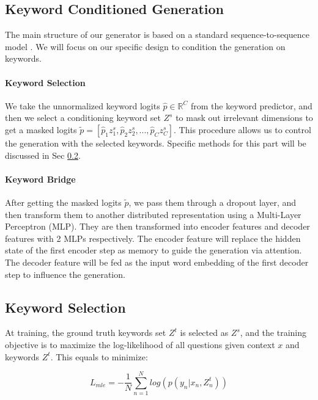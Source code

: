 \documentclass[letterpaper]{article} %
\begin{document}
\subsection{Keyword Conditioned Generation}

The main structure of our generator is based on a standard sequence-to-sequence model \citep{luong2015effective}. We will focus on our specific design to condition the generation on keywords. 

\paragraph{Keyword Selection} We take the unnormalized keyword logits $\hat{p} \in \mathbb{R}^C$ from the keyword predictor, and then we select a conditioning keyword set $Z^s$ to mask out irrelevant dimensions to get a masked logits $\tilde{p} = [\hat{p}_1 z^s_1, \hat{p}_2 z^s_2, ..., \hat{p}_C z^s_C]$. This procedure allows us to control the generation with the selected keywords. Specific methods for this part will be discussed in Sec \ref{sec:selection}.

\paragraph{Keyword Bridge} After getting the masked logits $\tilde{p}$, we pass them through a dropout layer, and then transform them to another distributed representation using a Multi-Layer Perceptron (MLP). They are then transformed into encoder features and decoder features with 2 MLPs respectively. The encoder feature will replace the hidden state of the first encoder step as memory to guide the generation via attention. The decoder feature will be fed as the input word embedding of the first decoder step to influence the generation.

\subsection{Keyword Selection}
\label{sec:selection}
At training, the ground truth keywords set $Z^t$ is selected as $Z^s$, and the training objective is to maximize the log-likelihood of all questions given context $x$ and keywords $Z^t$. This equals to minimize: 

\begin{equation}
  L_{mle} = -\frac{1}{N}\sum^N_{n=1}log(p(y_n|x_n,Z^t_n))
  \label{equ:mle}
\end{equation}
\end{document}
